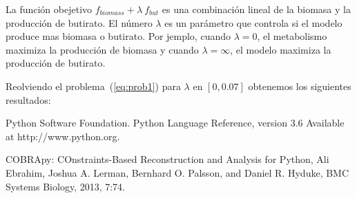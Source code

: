\documentclass[12pt,spanish]{article}
\begin{document}
La función obejetivo $f_{biomass} +  \lambda \ f_{but}$  es una combinación lineal de la biomasa y la producción de butirato. El número $\lambda$ es un parámetro que controla si el modelo produce mas biomasa o butirato. Por jemplo, cuando $\lambda = 0$, el metabolismo maximiza la producción de biomasa y cuando $\lambda = \infty $, el modelo maximiza la producción de butirato.

\par

Reolviendo el problema~(\ref{eq:prob1}) para $\lambda$ en $[0, 0.07]$ obtenemos los siguientes resultados:






\begin{thebibliography}{1}

 Python Software Foundation. Python Language Reference, version 3.6 Available at http://www.python.org.

 COBRApy: COnstraints-Based Reconstruction and Analysis for Python,
Ali Ebrahim, Joshua A. Lerman, Bernhard O. Palsson, and Daniel R. Hyduke,
BMC Systems Biology, 2013, 7:74.

\end{thebibliography}
\end{document}
